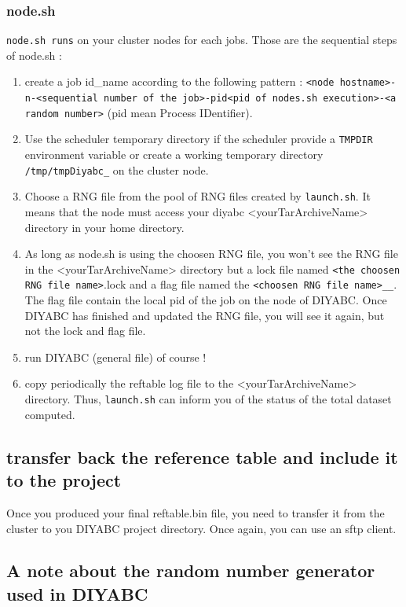 \subsubsection{node.sh}
\texttt{node.sh runs} on your cluster nodes for each jobs. Those are the sequential steps of node.sh :
\begin{enumerate}
    \item create a job id\_name according to the following pattern : \texttt{<node hostname>-n-<sequential number of the job>-pid<pid of nodes.sh execution>-<a random number>} (pid mean Process IDentifier).
    \item Use the scheduler temporary directory if the scheduler provide a \texttt{TMPDIR} environment variable or create a working temporary directory \texttt{/tmp/tmpDiyabc\_<job id>} on the cluster node.
    \item Choose a RNG file from the pool of RNG files created by \texttt{launch.sh}. It means that the node must access your diyabc <yourTarArchiveName> directory in your home directory. 
    \item As long as node.sh is using the choosen RNG file, you won't see the RNG file in the <yourTarArchiveName> directory but a lock file named \texttt{<the choosen RNG file name>}.lock and a flag file named the \texttt{<choosen RNG file name>\_<date of the run>\_<job id>}. The flag file contain the local pid of the job on the node of DIYABC. Once DIYABC has finished and updated the RNG file, you will see it again, but not the lock and flag file.
    \item run DIYABC (general file) of course !
    \item copy periodically the reftable log file to the <yourTarArchiveName> directory. Thus, \texttt{launch.sh} can inform you of the status of the total dataset computed.
\end{enumerate}



\subsection{transfer back the reference table and include it to the project}\label{clusterback}
Once you produced your final reftable.bin file, you need to transfer it from the cluster to you DIYABC project directory. Once again, you can use an sftp client.


\clearpage
\subsection{A note about the random number generator used in DIYABC}\label{rng}



  
